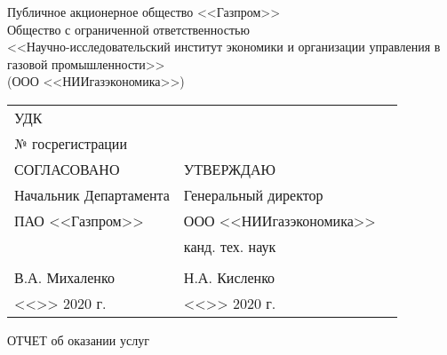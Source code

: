 \documentclass[a4paper, 14pt]{extreport}
\begin{document}
\begin{titlepage}                                                         
	\newpage                                                                        
	\begin{center}                                                        
		Публичное акционерное общество  <<Газпром>>\\
			Общество с ограниченной ответственностью\\
			<<Научно-исследовательский институт экономики и организации управления в газовой промышленности>>\\
			(ООО <<НИИгазэкономика>>)                             
                                                            
		\vspace{3em}                                                          
                                                     
		\begin{tabular}{p{}@{}l l}
			УДК & \\
			№ госрегистрации & \\
			СОГЛАСОВАНО & УТВЕРЖДАЮ \\
			Начальник Департамента & Генеральный директор \\
			ПАО <<Газпром>> & ООО <<НИИгазэкономика>> \\
			 & канд. тех. наук \\
			  & \\
			\makebox[3cm]{\hrulefill} В.А. Михаленко & \makebox[3cm]{\hrulefill} Н.А. Кисленко \\
			<<\makebox[1cm]{\hrulefill}>> \makebox[2cm]{\hrulefill} 2020 г. & <<\makebox[1cm]{\hrulefill}>> \makebox[2cm]{\hrulefill} 2020 г. \\
		\end{tabular}                                                    
	\end{center}                                                          
	
	\vspace{1.2em}                                                        
	
	\begin{center}                                                        
		\Large ОТЧЕТ \linebreak                                  
		об оказании услуг
	\end{center}                                                          
	

\end{titlepage}
\end{document}
